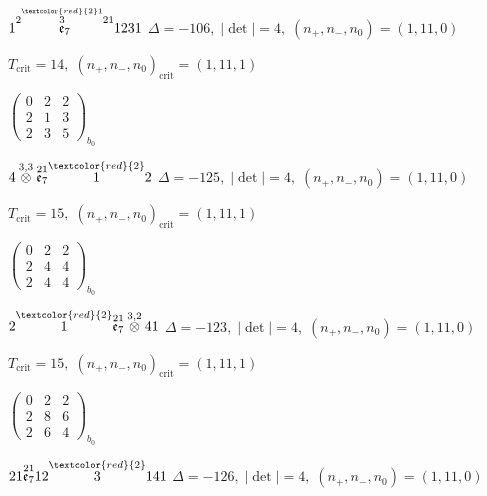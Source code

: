 \documentclass[10pt]{article}
\begin{document}
\smallskip

$1\overset{2\overset{\textcolor{red}{2}1}{3}21}{\mathfrak{e}_7}1231$ \quad $\Delta=-106,\; |\det|=4,\; (n_+,n_-,n_0)=(1,11,0)$

\hspace{1em}$T_{\text{crit}}=14,\; (n_+,n_-,n_0)_{\text{crit}}=(1,11,1)$

\hspace{2em}$\left(\begin{smallmatrix}0 & 2 & 2 \\ 2 & 1 & 3 \\ 2 & 3 & 5\end{smallmatrix}\right)_{\!b_0}$

\smallskip

$4\overset{3,3}{\otimes}\overset{21}{\mathfrak{e}_7}\overset{\textcolor{red}{2}}{1}2$ \quad $\Delta=-125,\; |\det|=4,\; (n_+,n_-,n_0)=(1,11,0)$

\hspace{1em}$T_{\text{crit}}=15,\; (n_+,n_-,n_0)_{\text{crit}}=(1,11,1)$

\hspace{2em}$\left(\begin{smallmatrix}0 & 2 & 2 \\ 2 & 4 & 4 \\ 2 & 4 & 4\end{smallmatrix}\right)_{\!b_0}$

\smallskip

$2\overset{\textcolor{red}{2}}{1}\overset{21}{\mathfrak{e}_7}\overset{3,2}{\otimes}41$ \quad $\Delta=-123,\; |\det|=4,\; (n_+,n_-,n_0)=(1,11,0)$

\hspace{1em}$T_{\text{crit}}=15,\; (n_+,n_-,n_0)_{\text{crit}}=(1,11,1)$

\hspace{2em}$\left(\begin{smallmatrix}0 & 2 & 2 \\ 2 & 8 & 6 \\ 2 & 6 & 4\end{smallmatrix}\right)_{\!b_0}$

$21\overset{21}{\mathfrak{e}_7}12\overset{\textcolor{red}{2}}{3}141$ \quad $\Delta=-126,\; |\det|=4,\; (n_+,n_-,n_0)=(1,11,0)$
\end{document}
